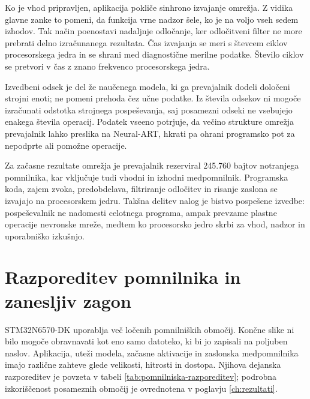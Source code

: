 Ko je vhod pripravljen, aplikacija pokliče sinhrono izvajanje omrežja. Z vidika
glavne zanke to pomeni, da funkcija vrne nadzor šele, ko je na voljo vseh sedem
izhodov. Tak način poenostavi nadaljnje odločanje, ker odločitveni filter ne more
prebrati delno izračunanega rezultata. Čas izvajanja se meri s števcem ciklov
procesorskega jedra in se shrani med diagnostične merilne podatke. Število
ciklov se pretvori v čas z znano frekvenco procesorskega jedra.

Izvedbeni odsek je del že naučenega modela, ki ga prevajalnik dodeli določeni
strojni enoti; ne pomeni prehoda čez učne podatke. Iz števila odsekov ni
mogoče izračunati odstotka strojnega pospeševanja, saj posamezni odseki ne
vsebujejo enakega števila operacij. Podatek vseeno potrjuje, da večino
strukture omrežja prevajalnik lahko preslika na Neural-ART, hkrati pa ohrani
programsko pot za nepodprte ali pomožne operacije.

Za začasne rezultate omrežja je prevajalnik rezerviral 245.760 bajtov
notranjega pomnilnika, kar vključuje tudi vhodni in izhodni medpomnilnik.
Programska koda, zajem zvoka, predobdelava, filtriranje odločitev in risanje
zaslona se izvajajo na procesorskem jedru. Takšna delitev nalog je bistvo
pospešene izvedbe: pospeševalnik ne nadomesti celotnega programa, ampak prevzame
plastne operacije nevronske mreže, medtem ko procesorsko jedro skrbi za vhod,
nadzor in uporabniško izkušnjo.

\section{Razporeditev pomnilnika in zanesljiv zagon}

STM32N6570-DK uporablja več ločenih pomnilniških območij. Končne slike ni bilo
mogoče obravnavati kot eno samo datoteko, ki bi jo zapisali na poljuben naslov.
Aplikacija, uteži modela, začasne aktivacije in zaslonska medpomnilnika imajo
različne zahteve glede velikosti, hitrosti in dostopa. Njihova dejanska
razporeditev je povzeta v tabeli \ref{tab:pomnilniska-razporeditev}; podrobna
izkoriščenost posameznih območij je ovrednotena v poglavju
\ref{ch:rezultati}.

